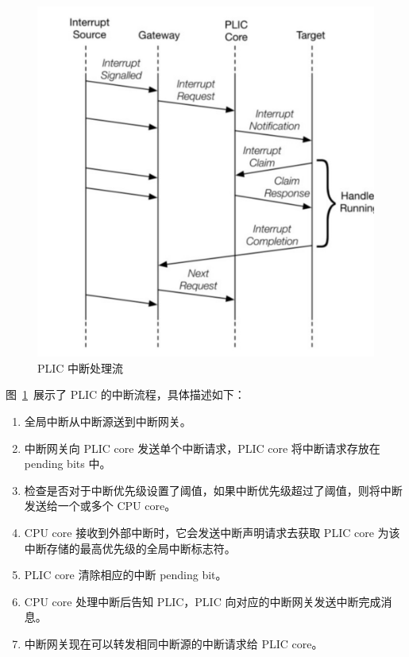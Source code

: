 \begin{figure}[]
    \centering
    \includegraphics[width=1\textwidth]{thesis-images/irq-flow.jpg}
    \caption{PLIC 中断处理流\cite{riscv-plic}}\label{fig:irq-flow}
\end{figure}

图~\ref{fig:irq-flow}~展示了 PLIC 的中断流程，具体描述如下：
\begin{enumerate}
    \item 全局中断从中断源送到中断网关。
    \item 中断网关向 PLIC core 发送单个中断请求，PLIC core 将中断请求存放在 pending bits 中。
    \item 检查是否对于中断优先级设置了阈值，如果中断优先级超过了阈值，则将中断发送给一个或多个 CPU core。
    \item CPU core 接收到外部中断时，它会发送中断声明请求去获取 PLIC core 为该中断存储的最高优先级的全局中断标志符。
    \item PLIC core 清除相应的中断 pending bit。
    \item CPU core 处理中断后告知 PLIC，PLIC 向对应的中断网关发送中断完成消息。
    \item 中断网关现在可以转发相同中断源的中断请求给 PLIC core。
\end{enumerate}

